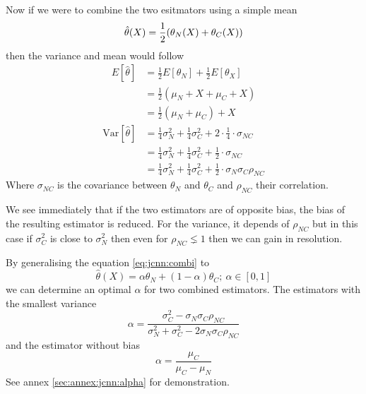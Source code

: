 \documentclass[../main.tex]{subfiles}
\begin{document}
Now if we were to combine the two esitmators using a simple mean
\begin{equation}
  \label{eq:jcnn:combi}
  \hat{\theta}(X) = \frac{1}{2} ( \theta_{N}(X) + \theta_{C}(X) ) \\
\end{equation}
then the variance and mean would follow
\begin{align}
  E[\hat{\theta}] & = \frac{1}{2}E[\theta_N] + \frac{1}{2}E[\theta_X]\\
                  & = \frac{1}{2}(\mu_N + X + \mu_C + X) \\
                  & = \frac{1}{2}(\mu_N + \mu_C) + X
\end{align}
\begin{align}
  \mathrm{Var}[\hat{\theta}] & = \frac{1}{4}\sigma^2_N + \frac{1}{4}\sigma^2_C + 2 \cdot \frac{1}{4} \cdot \sigma_{NC} \\
                             & = \frac{1}{4}\sigma^2_N + \frac{1}{4}\sigma^2_C + \frac{1}{2} \cdot \sigma_{NC} \\
                             & = \frac{1}{4}\sigma^2_N + \frac{1}{4}\sigma^2_C + \frac{1}{2} \cdot \sigma_{N} \sigma_C \rho_{NC}
\end{align}
Where $\sigma_{NC}$ is the covariance between $\theta_N$ and $\theta_C$ and $\rho_{NC}$ their correlation.

We see immediately that if the two estimators are of opposite bias, the bias of the resulting estimator is reduced. For the variance, it depends of $\rho_{NC}$ but in this case if $\sigma^2_C$ is close to $\sigma^2_N$ then even for $\rho_{NC} \lneq 1$ then we can gain in resolution.

By generalising the equation \ref{eq:jcnn:combi} to
\begin{equation}
  \hat{\theta}(X) = \alpha \theta_N + (1 - \alpha) \theta_C; ~ \alpha \in [0, 1]
\end{equation}
we can determine an optimal $\alpha$ for two combined estimators. The estimators with the smallest variance
\begin{equation}
  \alpha = \frac{\sigma_C^2 - \sigma_N \sigma_C \rho_{NC}}{\sigma_N^2 + \sigma_C^2 - 2\sigma_N \sigma_C \rho_{NC}}
\end{equation}
and the estimator without bias
\begin{equation}
  \alpha = \frac{\mu_C}{\mu_C - \mu_N}
\end{equation}
See annex \ref{sec:annex:jcnn:alpha} for demonstration.
\end{document}
